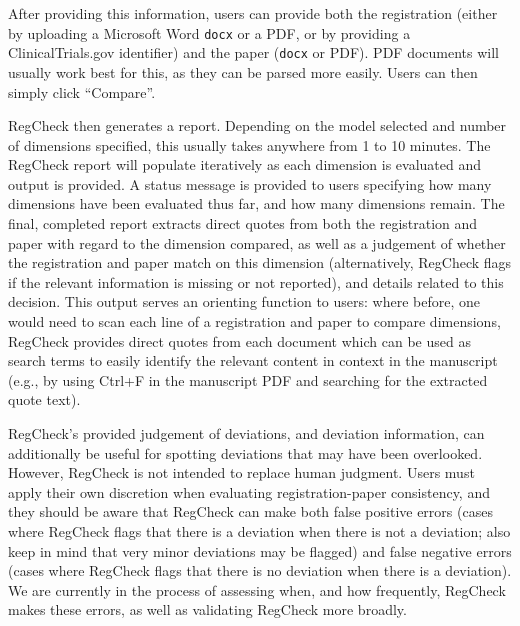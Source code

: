 \documentclass{article}
\begin{document}
After providing this information, users can provide both the registration (either by uploading a Microsoft Word \texttt{docx} or a PDF, or by providing a ClinicalTrials.gov identifier) and the paper (\texttt{docx} or PDF). PDF documents will usually work best for this, as they can be parsed more easily. Users can then simply click ``Compare''.

RegCheck then generates a report. Depending on the model selected and number of dimensions specified, this usually takes anywhere from 1 to 10 minutes. The RegCheck report will populate iteratively as each dimension is evaluated and output is provided. A status message is provided to users specifying how many dimensions have been evaluated thus far, and how many dimensions remain. The final, completed report extracts direct quotes from both the registration and paper with regard to the dimension compared, as well as a judgement of whether the registration and paper match on this dimension (alternatively, RegCheck flags if the relevant information is missing or not reported), and details related to this decision. This output serves an orienting function to users: where before, one would need to scan each line of a registration and paper to compare dimensions, RegCheck provides direct quotes from each document which can be used as search terms to easily identify the relevant content in context in the manuscript (e.g., by using Ctrl+F in the manuscript PDF and searching for the extracted quote text).

RegCheck's provided judgement of deviations, and deviation information, can additionally be useful for spotting deviations that may have been overlooked. However, RegCheck is not intended to replace human judgment. Users must apply their own discretion when evaluating registration-paper consistency, and they should be aware that RegCheck can make both false positive errors (cases where RegCheck flags that there is a deviation when there is not a deviation; also keep in mind that very minor deviations may be flagged) and false negative errors (cases where RegCheck flags that there is no deviation when there is a deviation). We are currently in the process of assessing when, and how frequently, RegCheck makes these errors, as well as validating RegCheck more broadly.
\end{document}
